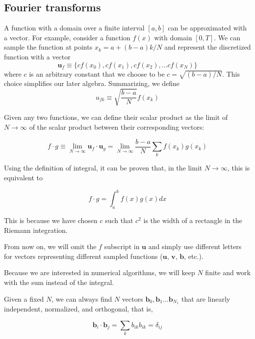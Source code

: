 \documentclass[justified, sixbynine]{tufte-book}
\theoremstyle{plain}%
\newtheorem * {corollary}{Corollary}
\theoremstyle{definition}
\theoremstyle{remark}
\newtheorem * {remark}{Remark}
\newtheorem * {note}{Note}
\begin{document}
\begin{fullwidth}
\newpage
\section{Fourier transforms}

A function with a domain over a finite interval $[a, b]$ can be approximated with a vector. For example, consider a function $f(x)$ with domain $[0, T]$. We can sample the function at points $x_k = a+(b-a)k/N$ and represent the discretized function with a vector
\begin{equation}
\mathbf{u}_f \equiv \{cf(x_0), cf(x_1), cf(x_2), ... cf(x_N)\}
\end{equation}
where $c$ is an arbitrary constant that we choose to be $c=\sqrt{(b-a)/N}$. This choice simplifies our later algebra.
Summarizing, we define
\begin{equation}
u_{fk} \equiv \sqrt{\frac{b-a}{N}}f(x_k)
\end{equation}

Given any two functions, we can define their scalar product as the limit of $N\rightarrow\infty$ of the scalar product between their corresponding vectors:

\begin{equation}
f \cdot g \equiv \lim_{N\rightarrow\infty} \mathbf{u}_f \cdot \mathbf{u}_g =
\lim_{N\rightarrow\infty} \frac{b-a}{N} \sum_k f(x_k) g(x_k)
\end{equation}

Using the definition of integral, it can be proven that, in the limit $N\rightarrow\infty$, this is equivalent to

\begin{equation}
f \cdot g = \int_a^b f(x) g(x) dx
\end{equation}

This is because we have chosen $c$ such that $c^2$ is the width of a rectangle in the Riemann integration.

From now on, we will omit the $f$ subscript in $\mathbf{u}$ and simply use different letters for vectors representing different sampled functions ($\mathbf{u}$, $\mathbf{v}$, $\mathbf{b}$, etc.).

Because we are interested in numerical algorithms, we will keep $N$ finite and work with the sum instead of the integral.

Given a fixed $N$, we can always find $N$ vectors $\mathbf{b}_0, \mathbf{b}_1...\mathbf{b}_{N_1}$ that are linearly independent, normalized, and orthogonal, that is, 

\begin{equation}
\mathbf{b}_i \cdot \mathbf{b}_j = \sum_k b_{ik} b_{ik} = \delta_{ij}
\end{equation}


\end{fullwidth}
\end{document}

